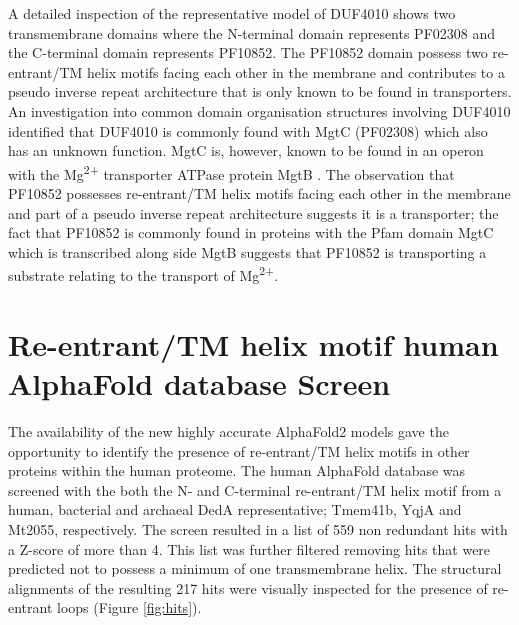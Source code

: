 A detailed inspection of the representative model of DUF4010 shows two transmembrane domains where the N-terminal domain represents PF02308 and the C-terminal domain represents PF10852.  The PF10852 domain possess two re-entrant/TM helix motifs facing each other in the membrane and contributes to a pseudo inverse repeat architecture that is only known to be found in transporters.  An investigation into common domain organisation structures involving DUF4010 identified that DUF4010 is commonly found with MgtC (PF02308) which also has an unknown function.  MgtC is, however, known to be found in an operon with the Mg\textsuperscript{2+} transporter ATPase protein MgtB \cite{moncrief1999magnesium}.  The observation that PF10852 possesses re-entrant/TM helix motifs facing each other in the membrane and part of a pseudo inverse repeat architecture suggests it is a transporter; the fact that PF10852 is commonly found in proteins with the Pfam domain MgtC which is transcribed along side MgtB suggests that PF10852 is transporting a substrate relating to the transport of Mg\textsuperscript{2+}.


\section{Re-entrant/TM helix motif human AlphaFold database Screen}

The availability of the new highly accurate AlphaFold2 models gave the opportunity to identify the presence of re-entrant/TM helix motifs in other proteins within the human proteome.  The human AlphaFold database \cite{david2022alphafold} was screened with the both the N- and C-terminal re-entrant/TM helix motif from a human, bacterial and archaeal DedA representative; Tmem41b, YqjA and Mt2055, respectively. The screen resulted in a list of 559 non redundant hits with a Z-score of more than 4.  This list was further filtered removing hits that were predicted not to possess a minimum of one transmembrane helix.  The structural alignments of the resulting 217 hits were visually inspected for the presence of re-entrant loops (Figure \ref{fig:hits}).

